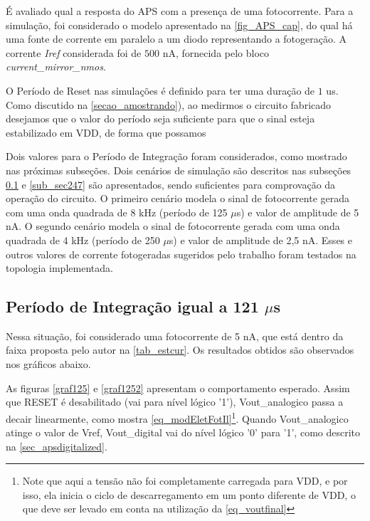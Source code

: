 É avaliado qual a resposta do APS com a presença de uma fotocorrente. Para a simulação, foi considerado o modelo apresentado na \autoref{fig_APS_cap}, do qual há uma fonte de corrente em paralelo a um diodo representando a fotogeração. A corrente \textit{Iref} considerada foi de $500$ nA, fornecida pelo bloco \textit{current\_mirror\_nmos}.

O Período de Reset nas simulações é definido para ter uma duração de $1$ us. Como discutido na \autoref{secao_amostrando}), ao medirmos o circuito fabricado desejamos que o valor do período seja suficiente para que o sinal esteja estabilizado em VDD, de forma que possamos

Dois valores para o Período de Integração foram considerados, como mostrado nas próximas subseções.
Dois cenários de simulação são descritos nas subseções \ref{sub_sec121} e \ref{sub_sec247} são apresentados, sendo suficientes para comprovação da operação do circuito. O primeiro cenário modela o sinal de fotocorrente gerada com uma onda quadrada de 8 kHz (período de 125 $\mu$s) e valor de amplitude de 5 nA. O segundo cenário modela o sinal de fotocorrente gerada com uma onda quadrada de 4 kHz (período de 250 $\mu$s) e valor de amplitude de 2,5 nA. Esses e outros valores de corrente fotogeradas sugeridos pelo trabalho \cite{LidianeCampos} foram testados na topologia implementada.

\subsection{Período de Integração igual a 121 $\mu$s}
\label{sub_sec121}

Nessa situação, foi considerado uma fotocorrente de 5 nA, que está dentro da faixa proposta pelo autor na \autoref{tab_estcur}. Os resultados obtidos são observados nos gráficos abaixo.

As figuras \ref{graf125} e \ref{graf1252} apresentam o comportamento esperado. Assim que RESET é desabilitado (vai para nível lógico '1'), Vout\_analogico passa a decair linearmente, como mostra \autoref{eq_modEletFotIl}\footnote{Note que aqui a tensão não foi completamente carregada para VDD, e por isso, ela inicia o ciclo de descarregamento em um ponto diferente de VDD, o que deve ser levado em conta na utilização da \autoref{eq_voutfinal}}. Quando Vout\_analogico atinge o valor de Vref, Vout\_digital vai do nível lógico '0' para '1', como descrito na \autoref{sec_apsdigitalized}.


